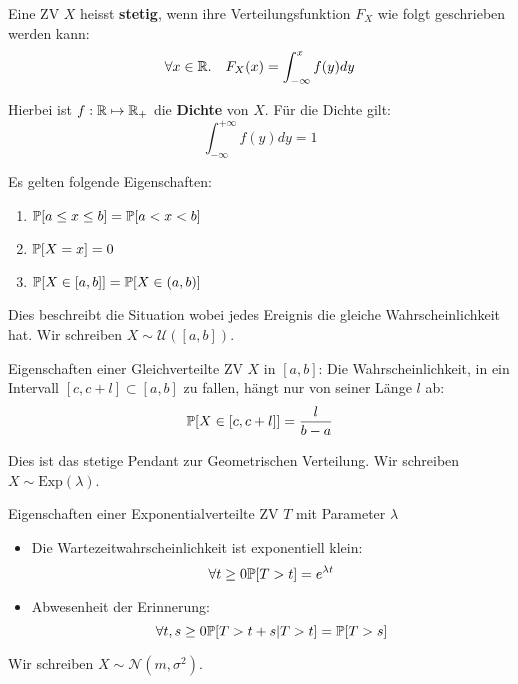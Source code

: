 
\begin{mainbox}{}
    Eine ZV $X$ heisst \textbf{stetig}, wenn ihre Verteilungsfunktion $F_X$ wie folgt geschrieben werden kann:
    $$\forall x \in \mathbb{R}. \quad F_X(x) = \int_{-\infty}^x f(y)dy$$
\end{mainbox}

Hierbei ist $f: \mathbb{R} \mapsto \mathbb{R}_+$ die \textbf{Dichte} von $X$. Für die Dichte gilt:
$$\int_{-\infty}^{+\infty} f(y)dy = 1$$

Es gelten folgende Eigenschaften: 
\begin{enumerate}
    \item $\mathbb{P} [a \leq x \leq b] = \mathbb{P} [a < x < b]$ 
    \item $\mathbb{P}[X = x] = 0$
    \item $\mathbb{P}[X \in [a, b ]] = \mathbb{P} [X \in (a,b)]$
\end{enumerate}



Dies beschreibt die Situation wobei jedes Ereignis die gleiche Wahrscheinlichkeit hat. Wir schreiben $X \sim \mathcal{U}([a,b])$.
\begin{subbox}{Eigenschaften einer Gleichverteilte ZV $X$ in $[a, b]$:}
    Die Wahrscheinlichkeit, in ein Intervall $[c, c + l] \subset [a, b]$ zu fallen, hängt nur von seiner Länge $l$ ab:
        $$\mathbb{P}[X \in [c, c+l]] = \frac{l}{b-a}$$
\end{subbox}

 Dies ist das stetige Pendant zur Geometrischen Verteilung. Wir schreiben $X \sim \text{Exp}(\lambda)$.

\begin{subbox}{Eigenschaften einer Exponentialverteilte ZV $T$ mit Parameter $\lambda$}
    \begin{itemize}
        \item Die Wartezeitwahrscheinlichkeit ist exponentiell klein:
        $$\forall t \geq 0 \mathbb{P}[T > t] = e^{\lambda t}$$
        \item Abwesenheit der Erinnerung:
        $$\forall t, s\geq 0 \mathbb{P}[T > t + s|T > t] = \mathbb{P}[T > s]$$
    \end{itemize}
\end{subbox}


 Wir schreiben $X \sim \mathcal{N}(m, \sigma^2)$.


